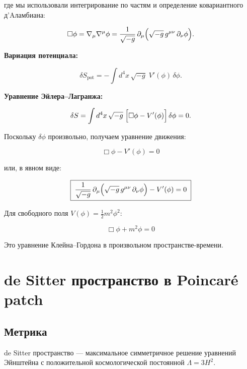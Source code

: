 \documentclass[12pt,a4paper]{article}
\begin{document}
где мы использовали интегрирование по частям и определение ковариантного
д'Aламбиана:

\begin{equation}
\Box\phi = \nabla_\mu\nabla^\mu\phi = \frac{1}{\sqrt{-g}}\,\partial_\mu\Bigl(\sqrt{-g}\,g^{\mu\nu}\,\partial_\nu\phi\Bigr).
\end{equation}

\textbf{Вариация потенциала:}

\begin{equation}
\delta S_{\text{pot}} = -\int d^4x\,\sqrt{-g}\; V'(\phi)\,\delta\phi.
\end{equation}

\textbf{Уравнение Эйлера--Лагранжа:}

\begin{equation}
\delta S = \int d^4x\,\sqrt{-g}\;\Bigl[\Box\phi - V'(\phi)\Bigr]\,\delta\phi = 0.
\end{equation}

Поскольку $\delta\phi$ произвольно, получаем уравнение движения:

\begin{equation}
\boxed{\;\Box\phi - V'(\phi) = 0\;}
\end{equation}

или, в явном виде:

\begin{equation}
\boxed{\;\frac{1}{\sqrt{-g}}\,\partial_\mu\Bigl(\sqrt{-g}\,g^{\mu\nu}\,\partial_\nu\phi\Bigr) - V'(\phi) = 0\;}
\end{equation}

Для свободного поля $V(\phi) = \frac{1}{2}m^2\phi^2$:

\begin{equation}
\boxed{\;\Box\phi + m^2\phi = 0\;}
\end{equation}

Это уравнение Клейна--Гордона в произвольном пространстве-времени.

\section{de Sitter пространство в Poincar\'e patch}

\subsection{Метрика}

de Sitter пространство — максимальное симметричное решение уравнений Эйнштейна
с положительной космологической постоянной $\Lambda = 3H^2$.
\end{document}
